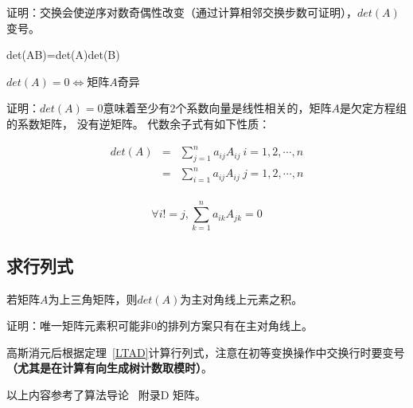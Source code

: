 证明：交换会使逆序对数奇偶性改变（通过计算相邻交换步数可证明），$det(A)$变号。
\begin{property}
	det(AB)=det(A)det(B)
\end{property}
\begin{theorem}
	$det(A)=0\Leftrightarrow$矩阵$A$奇异
\end{theorem}
证明：$det(A)=0$意味着至少有2个系数向量是线性相关的，矩阵$A$是欠定方程组的系数矩阵，
没有逆矩阵。
代数余子式有如下性质：
\begin{property}
    \begin{eqnarray*}
        det(A)&=&\sum_{j=1}^n{a_{ij}A_{ij}} ~i=1,2,\cdots,n\\
        &=&\sum_{i=1}^n{a_{ij}A_{ij}} ~j=1,2,\cdots,n\\
    \end{eqnarray*}
\end{property}
\begin{property}
    \begin{displaymath}
        \forall i!=j,\sum_{k=1}^n{a_{ik}A_{jk}}=0
    \end{displaymath}
\end{property}
\subsection{求行列式}
\begin{theorem}\label{LTAD}
	若矩阵$A$为上三角矩阵，则$det(A)$为主对角线上元素之积。
\end{theorem}
证明：唯一矩阵元素积可能非0的排列方案只有在主对角线上。

高斯消元后根据定理~\ref{LTAD}计算行列式，注意在初等变换操作中交换行时要变号
{\bfseries （尤其是在计算有向生成树计数取模时）}。

以上内容参考了算法导论~\cite{ITA3} 附录D 矩阵。
